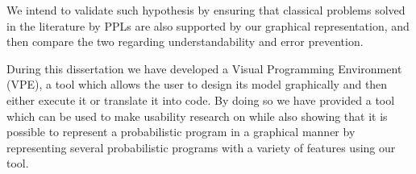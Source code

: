 We intend to validate such hypothesis by ensuring that classical problems solved
in the literature by PPLs are also supported by our graphical representation,
and then compare the two regarding understandability and error prevention.

During this dissertation we have developed a Visual Programming Environment (VPE),
a tool which allows the user to design its model graphically and then either
execute it or translate it into code. By doing so we have provided a tool which can be used to make usability research
on while also showing that it is possible
to represent a probabilistic program in a graphical manner by representing several
probabilistic programs with a variety of features using our tool.

